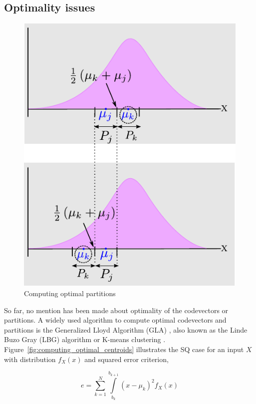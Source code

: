 \subsection{Optimality issues}
\begin{figure}[t]		
	\center	
	\includegraphics[height=0.5\textheight]{figs/Quantization_optimalPartitions2.pdf}
	\caption{Computing optimal partitions}
	\label{fig:computing_optimal_partitions}
\end{figure}

So far, no mention has been made about optimality of the codevectors or partitions.  A widely used algorithm to compute optimal codevectors and partitions is the Generalized Lloyd Algorithm (GLA) \cite{1991_BOOK_VQ_GershoGray}, also known as the Linde Buzo Gray (LBG) algorithm \cite{1982_JNL_LeastSquaresQuantization_Lloyd} or K-means clustering \cite{1967_CNF_Kmeans_Macqueen}.  Figure~\ref{fig:computing_optimal_centroids} illustrates the SQ case for an input $X$ with distribution $f_X(x)$ and squared error criterion, 

\begin{equation}
e=\sum\limits_{k=1}^{N} \int\limits_{b_k}^{b_{k+1}}(x-\mu_k)^2f_X(x)
\end{equation}

